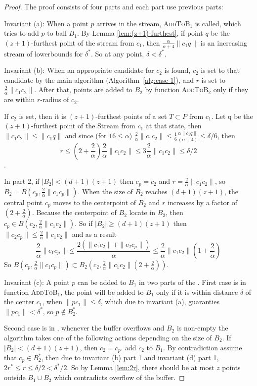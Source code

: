 \documentclass[envcountsame]{cls/cccg15}
\newcommand{\rc}{r}
\newcommand{\cp}{c_p}
\newcommand{\dz}{(d + 1)(z + 1)}
\newcommand{\textproc}{\textsc}
\newcommand{\len}[1]{\|{#1}\|}
\newcommand{\radius}[1]{\frac{2}{\alpha} \len{c_1 #1}}
\newcommand{\lee}{\leqslant}
\newcommand{\gee}{\geqslant}
\renewcommand{\leq}{\lee}
\renewcommand{\ge}{\gee}
\begin{document}
\begin{proof} The proof consists of four parts and each part use previous parts:

Invariant (a): 
When a point $p$ arrives in the stream, \textproc{AddToB$_1$} is called, which tries to add $p$ to ball $B_1$.
By Lemma \ref{lem:(z+1)-furthest}, if point $q$ be the $(z+1)$-furthest point of the stream from $c_1$,
then $\frac{\alpha}{\alpha+4} \len{c_1q}$ is an increasing stream of lowerbounds for $\delta^*$. So at any point, $\delta < \delta^*$.

Invariant (b): 
When an appropriate candidate for $c_2$ is found, 
$c_2$ is set to that candidate by the main algorithm (Algorithm~\ref{alg:case-1}),
and $\rc$ is set to $\frac{2}{\alpha}\len{c_1c_2}$.
After that, points are added to $B_2$ by function \textproc{AddToB$_2$}
only if they are within $\rc$-radius of $c_2$. 

If $c_2$ is set, then it is $(z+1)$-furthest points of a set $T \subset P$ from $c_1$. 
Let q be the $(z+1)$-furthest point of the Stream from $c_1$ at that state, then $\len{c_1c_2} \leq \len{c_1q}$ and since (for $16 \leq \alpha$) $\radius{c_2} \leq \frac{1}{6}\frac{\alpha \len{c_1 q}}{(\alpha + 4)} \leq \delta / 6$, then $$r \leq (2 + \frac{2}{\alpha})\radius{c_2} \leq 3 \radius{c_2}  \leq \delta /2$$.

In part 2, if $|B_2| < \dz$ then $c_p = c_2$ and $r = \radius{c_2}$, so $B_2 = B(c_p, \radius{c_p})$. 
When the size of $B_2$ reaches $\dz$, the central point $\cp$ moves to the centerpoint of $B_2$ and $\rc$ increases by a factor of $(2 + \frac{2}{\alpha})$. 
Because the centerpoint of $B_2$ locate in $B_2$, then $c_p \in B(c_2, \radius{c_2})$.
So if $|B_2| \ge \dz$ then $\len{c_2 c_p} \leq \radius{c_2}$ and as a result
$$\radius{c_p} \leq \frac{2 (\len{c_1 c_2} + \len{c_2 c_p})}{\alpha} \leq \radius{c_2}(1 + \frac{2}{\alpha})$$ 
So $B(c_p, \radius{c_p}) \subset B_2(c_2, \radius{c_2}(2 + \frac{2}{\alpha}))$.

Invariant (c): A point $p$ can be added to $B_1$ in two parts of the . 
First case is in function \textproc{AddToB$_1$}, the point will be added to $B_1$ only if it is within distance $\delta$ of the center $c_1$,  when $\len{pc_1} \leq \delta$, which due to invariant (a), guaranties $\len{pc_1} < \delta^*$, so $p \not \in B_2^*$.

Second case is in , whenever the buffer overflows and $B_2$ is non-empty the algorithm takes one of the following actions depending on the size of $B_2$.
If $|B_2| < \dz $, then $c_2 = c_p$.  add $c_2$ to $B_1$.
By contradiction assume that $c_p \in B_2^*$, then due to invariant (b) part 1 and invariant (d) part 1, $2r^* \leq r \leq \delta/2 < \delta^*/2$. So by Lemma \ref{lem:2r}, there should be at most $z$ points outside $B_1 \cup B_2$ which contradicts overflow of the buffer. 


\end{proof}
\end{document}

